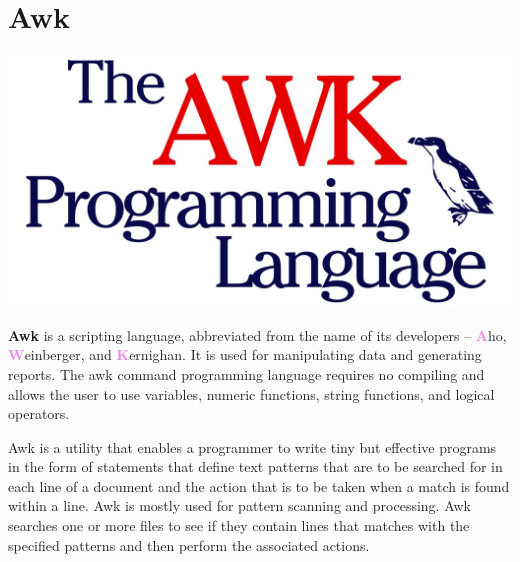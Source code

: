 \documentclass[12pt]{article}
\begin{document}
\newpage

\section{Awk}
\vspace{1.5 em}
\noindent\begin{minipage}{0.5\textwidth}
\includegraphics[width=\linewidth]{awk.jpg}
\cite{fig:Awk}
\end{minipage}
\hfill
\begin{minipage}{0.5\textwidth}\raggedleft
\textbf{Awk}\cite{Awk:9} is a scripting language, abbreviated from the name of its developers – \textbf{\textcolor{violet}{A}}ho, \textbf{\textcolor{violet}{W}}einberger, and \textbf{\textcolor{violet}{K}}ernighan. It is used for manipulating data and generating reports. The awk command programming language requires no compiling and allows the user to use variables, numeric functions, string functions, and logical operators. \vspace{1 em}
\end{minipage}
 Awk is a utility that enables a programmer to write tiny but effective programs in the form of statements that define text patterns that are to be searched for in each line of a document and the action that is to be taken when a match is found within a line. Awk is mostly used for pattern scanning and processing.
 Awk searches one or more files to see if they contain lines that matches with the specified patterns and then perform the associated actions. 
\end{document}
